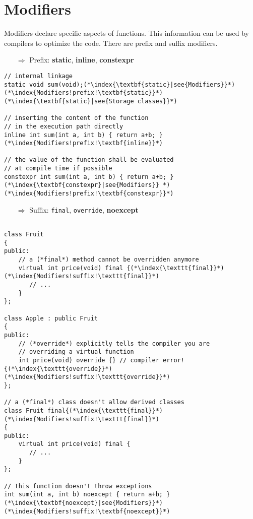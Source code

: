 \documentclass[10pt]{book}
\begin{document}
\section{Modifiers}
Modifiers declare specific aspects of functions. This information can be used by compilers to optimize the code. There are prefix and suffix modifiers.
\begin{enumerate}
\item[$\Rightarrow$]  Prefix: \textbf{static}, \textbf{inline}, \textbf{constexpr}
\end{enumerate}
\begin{lstlisting}
// internal linkage
static void sum(void);(*\index{\textbf{static}|see{Modifiers}}*)(*\index{Modifiers!prefix!\textbf{static}}*)(*\index{\textbf{static}|see{Storage classes}}*)

// inserting the content of the function
// in the execution path directly
inline int sum(int a, int b) { return a+b; }(*\index{Modifiers!prefix!\textbf{inline}}*)

// the value of the function shall be evaluated
// at compile time if possible
constexpr int sum(int a, int b) { return a+b; }(*\index{\textbf{constexpr}|see{Modifiers}} *)(*\index{Modifiers!prefix!\textbf{constexpr}}*)
\end{lstlisting}
\begin{enumerate}
\item[$\Rightarrow$]  Suffix: \texttt{final}, \texttt{override}, \textbf{noexcept}
\end{enumerate}
\begin{lstlisting}

class Fruit
{
public:
    // a (*final*) method cannot be overridden anymore
    virtual int price(void) final {(*\index{\texttt{final}}*)(*\index{Modifiers!suffix!\texttt{final}}*)
       // ...
    }
};

class Apple : public Fruit
{
public:
    // (*override*) explicitly tells the compiler you are
    // overriding a virtual function
    int price(void) override {} // compiler error!{(*\index{\texttt{override}}*)(*\index{Modifiers!suffix!\texttt{override}}*)
};

// a (*final*) class doesn't allow derived classes
class Fruit final{(*\index{\texttt{final}}*)(*\index{Modifiers!suffix!\texttt{final}}*)
{
public:
    virtual int price(void) final {
       // ...
    }
};

// this function doesn't throw exceptions
int sum(int a, int b) noexcept { return a+b; }(*\index{\textbf{noexcept}|see{Modifiers}}*)(*\index{Modifiers!suffix!\textbf{noexcept}}*)
\end{lstlisting}
%
%
\end{document}
